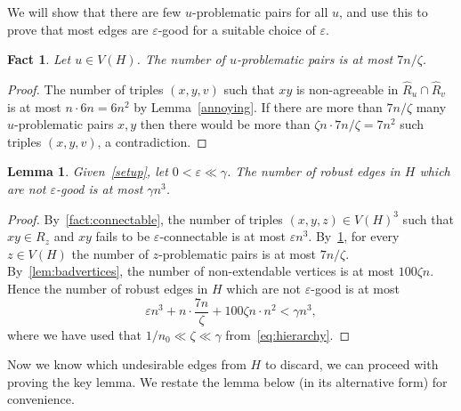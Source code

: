 \documentclass[A4paper,12pt]{article}
\newtheorem{lem}[thm]{Lemma}
\newtheorem{fact}[thm]{Fact}
\theoremstyle{definition}
\newcommand{\eps}{\varepsilon}
\begin{document}
We will show that there are few $u$-problematic pairs for all $u$, and use this to prove that most edges are $\eps$-good for a suitable choice of $\eps$.

\begin{fact}\label{lem:problematic}
Let $u\in V(H)$. The number of $u$-problematic pairs is at most $7n/\zeta$.
\end{fact}
\begin{proof}
The number of triples $(x,y,v)$ such that $xy$ is non-agreeable in $\hat{R}_{u}\cap \hat{R}_{v}$ is at most $n \cdot 6n=6n^2$ by Lemma~\ref{annoying}. If there are more than $7n/\zeta$ many $u$-problematic pairs $x,y$ then there would be more than $\zeta n \cdot 7n/\zeta = 7n^2$ such triples $(x,y,v)$, a contradiction.
\end{proof}



\begin{lem}
\label{lem:goodedges}
Given~\cref{setup}, let $0 < \eps \ll \gamma$. The number of robust edges in $H$ which are not $\eps$-good is at most $\gamma n^3$. %
\end{lem}
\begin{proof}
 By~\cref{fact:connectable}, the number of triples $(x,y,z)\in V(H)^3$ such that $xy\in R_z$ and $xy$ fails to be $\eps$-connectable is at most $\eps n^3$. By~\cref{lem:problematic}, for every $z\in V(H)$ the number of $z$-problematic pairs is at most $7n/\zeta$. 
 By~\cref{lem:badvertices}, the number of non-extendable vertices is at most $100 \zeta n$. 
 Hence the number of robust edges in $H$ which are not $\varepsilon$-good is at most 
\begin{equation*}
\eps n^3+ n \cdot \frac{7n}{\zeta} + 100 \zeta n\cdot n^2 < \gamma  n^3,
\end{equation*}
where we have used that $1/n_0 \ll \zeta \ll \gamma$ from~\eqref{eq:hierarchy}.
\end{proof}

Now we know which undesirable edges from $H$ to discard, we can proceed with proving the key lemma. We restate the lemma below (in its alternative form) for convenience.
\keyalt*
\end{document}
